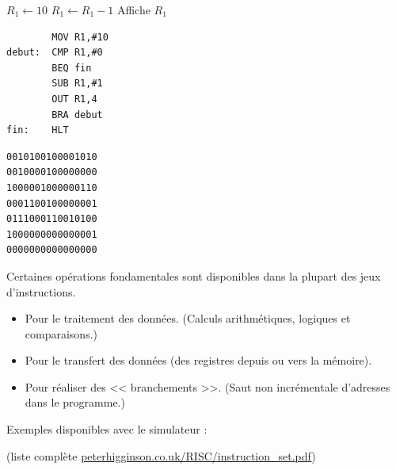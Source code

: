 \begin{multicols}{3}
\centering

\begin{algorithm}[H]
$R_1\leftarrow10$\;
  {   $R_1\leftarrow R_1-1$\;
      Affiche $R_1$\;
  }
\end{algorithm}

\begin{verbatim}
        MOV R1,#10
debut:  CMP R1,#0
        BEQ fin
        SUB R1,#1
        OUT R1,4
        BRA debut
fin:    HLT
\end{verbatim}

\begin{verbatim}
0010100100001010
0010000100000000
1000001000000110
0001100100000001
0111000110010100
1000000000000001
0000000000000000
\end{verbatim}
\end{multicols}

Certaines opérations fondamentales sont disponibles dans la plupart des jeux d'instructions.

\begin{itemize}
	\item Pour le traitement des données. (Calculs arithmétiques, logiques et comparaisons.)
	
	\item Pour le transfert des données (des registres depuis ou vers la mémoire).
	
	\item Pour réaliser des << branchements >>. (Saut non incrémentale d'adresses dans le programme.)
\end{itemize}

Exemples disponibles avec le simulateur : 

(liste complète \href{peterhigginson.co.uk/RISC/instruction_set.pdf}{peterhigginson.co.uk/RISC/instruction\_set.pdf})


